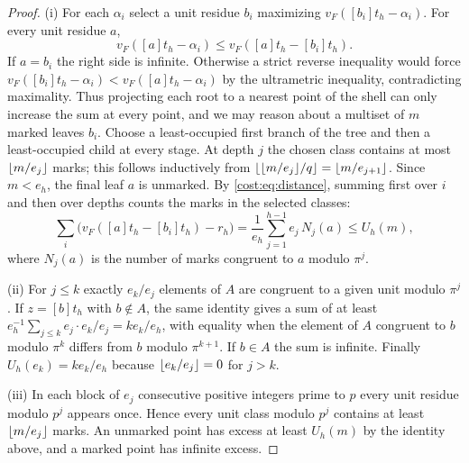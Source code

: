 \begin{proof}
(i) For each $\alpha_i$ select a unit residue $b_i$ maximizing $v_F([b_i]t_h-\alpha_i)$. For
every unit residue $a$,
\[
 v_F([a]t_h-\alpha_i)\le v_F([a]t_h-[b_i]t_h).
\]
If $a=b_i$ the right side is infinite. Otherwise a strict reverse inequality would force
$v_F([b_i]t_h-\alpha_i)<v_F([a]t_h-\alpha_i)$ by the ultrametric inequality, contradicting
maximality. Thus projecting each root to a nearest point of the shell can only increase the
sum at every point, and we may reason about a multiset of $m$ marked leaves $b_i$. Choose a
least-occupied first branch of the tree and then a least-occupied child at every stage. At
depth $j$ the chosen class contains at most $\lfloor m/e_j\rfloor$ marks; this follows inductively
from $\lfloor\lfloor m/e_j\rfloor/q\rfloor=\lfloor m/e_{j+1}\rfloor$. Since $m<e_h$, the final leaf $a$ is
unmarked. By \eqref{cost:eq:distance}, summing first over $i$ and then over depths counts
the marks in the selected classes:
\[
 \sum_i\bigl(v_F([a]t_h-[b_i]t_h)-r_h\bigr)=\frac1{e_h}\sum_{j=1}^{h-1}e_j\,N_j(a)\le U_h(m),
\]
where $N_j(a)$ is the number of marks congruent to $a$ modulo $\pi^j$.

(ii) For $j\le k$ exactly $e_k/e_j$ elements of $A$ are congruent to a given unit modulo
$\pi^j$. If $z=[b]t_h$ with $b\notin A$, the same identity gives a sum of at least
$e_h^{-1}\sum_{j\le k}e_j\cdot e_k/e_j=ke_k/e_h$, with equality when the element of $A$
congruent to $b$ modulo $\pi^k$ differs from $b$ modulo $\pi^{k+1}$. If $b\in A$ the sum is
infinite. Finally $U_h(e_k)=ke_k/e_h$ because $\lfloor e_k/e_j\rfloor=0$ for $j>k$.

(iii) In each block of $e_j$ consecutive positive integers prime to $p$ every unit residue
modulo $p^j$ appears once. Hence every unit class modulo $p^j$ contains at least
$\lfloor m/e_j\rfloor$ marks. An unmarked point has excess at least $U_h(m)$ by the identity above,
and a marked point has infinite excess.
\end{proof}

